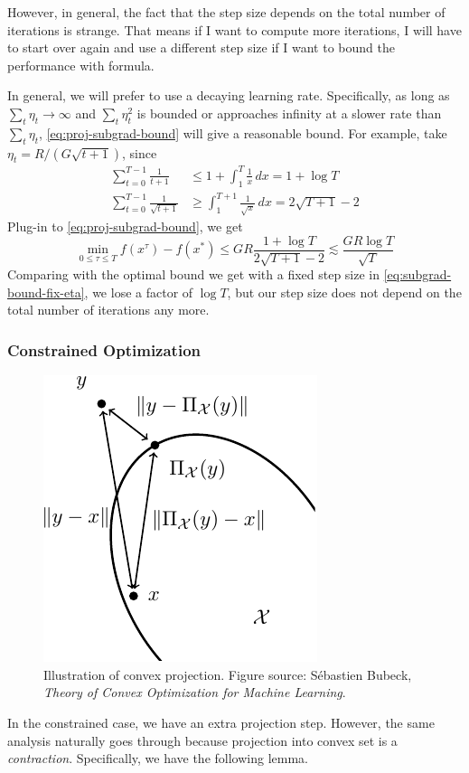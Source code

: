 \documentclass{scrartcl}
\begin{document}
However, in general, the fact that the step size depends on the total number of iterations is
strange. That means if I want to compute more iterations, I will have to start over again and use a
different step size if I want to bound the performance with formula.

In general, we will prefer to use a decaying learning rate. Specifically, as long as
$\sum_t\eta_t\rightarrow \infty$ and $\sum_t\eta_t^2$ is bounded or approaches infinity at a slower
rate than $\sum_t\eta_t$, \eqref{eq:proj-subgrad-bound} will give a reasonable bound. For example,
take $\eta_t=R/(G\sqrt{t+1})$, since
\[
\begin{aligned}
  \sum_{t=0}^{T-1} \frac{1}{t+1} &\leq 1 + \int_1^{T} \frac{1}{x}\,dx = 1 + \log T \\
  \sum_{t=0}^{T-1} \frac{1}{\sqrt{t+1}} &\geq \int_1^{T+1}\frac{1} {\sqrt{x}}\,dx =
  2\sqrt{T+1}-2
\end{aligned}
\]
Plug-in to \eqref{eq:proj-subgrad-bound}, we get
\begin{equation}
  \min_{0\leq \tau \leq T} f(x^\tau) - f(x^*) \leq GR \frac{1+\log T}{2\sqrt{T+1}-2} \lesssim \frac
  {GR\log T}{\sqrt{T}}
\end{equation}
Comparing with the optimal bound we get with a fixed step size in \eqref{eq:subgrad-bound-fix-eta},
we lose a factor of $\log T$, but our step size does not depend on the total number of iterations any
more.

\subsubsection{Constrained Optimization}

\begin{figure}
\centering
\includegraphics[width=.8\linewidth]{figs/convex-projection}
\caption{Illustration of convex projection. Figure source: S{\'e}bastien Bubeck, \emph{Theory of
Convex Optimization for Machine Learning}.}
\end{figure}
In the constrained case, we have an extra projection step. However, the same analysis naturally goes
through because projection into convex set is a \emph{contraction}. Specifically, we have the
following lemma.
\end{document}
